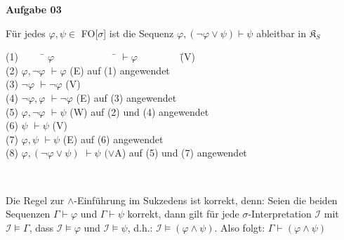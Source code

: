 \documentclass[a4paper,10pt]{article}
\begin{document}
	\textbf{Aufgabe 03}
	\begin{compactenum} [(a)]
		\item Für jedes $ \varphi, \psi \in $ FO$[ \sigma $] ist die Sequenz $ \varphi, (\lnot \varphi \vee \psi ) \vdash \psi $ ableitbar in $ \mathfrak{K}_S $
		\begin{tabbing}
			(1) $ \qquad $ \= $ \varphi \qquad \qquad \qquad $ \= $\vdash \varphi \qquad \qquad $ \= (V)\\
			(2) \> $ \varphi, \lnot \varphi $ \> $\vdash \varphi $ \> (E) auf (1) angewendet \\
			(3) \> $ \lnot \varphi $ \> $ \vdash \lnot \varphi $ \> (V)\\
			(4) \> $ \lnot \varphi, \varphi $ \> $ \vdash \lnot \varphi $ \> (E) auf (3) angewendet\\
			(5) \> $ \varphi, \lnot \varphi $ \> $ \vdash \psi $ \> (W) auf (2) und (4) angewendet\\
			(6) \>$ \psi $ \> $ \vdash \psi $ \> (V)\\
			(7) \>$ \varphi, \psi $ \> $ \vdash \psi $ \> (E) auf (6) angewendet\\
			(8) \> $ \varphi, (\lnot \varphi \vee \psi) $ \> $ \vdash \psi $ \>$ (\vee $A) auf (5) und (7) angewendet
		\end{tabbing}\
		
		\item Die Regel zur $ \wedge $-Einführung im Sukzedens ist korrekt, denn: Seien die beiden Sequenzen $ \Gamma \vdash \varphi $  und $ \Gamma \vdash \psi $ korrekt, dann gilt für jede $ \sigma $-Interpretation $ \mathcal{I} $ mit $ \mathcal{I} \models \Gamma $, dass $ \mathcal{I} \models \varphi $ und $ \mathcal{I} \models \psi $, d.h.: $ \mathcal{I} \models (\varphi \wedge \psi) $. Also folgt: $ \Gamma \vdash (\varphi \wedge \psi) $
	\end{compactenum}
\end{document}
